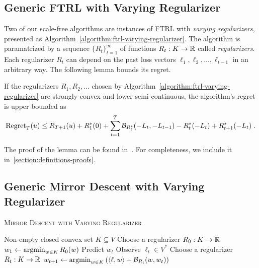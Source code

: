 \subsection{Generic FTRL with Varying Regularizer}
\label{section:generic-ftrl}

Two of our scale-free algorithms are instances of \textsc{FTRL} with
\emph{varying regularizers}, presented as
Algorithm~\ref{algorithm:ftrl-varying-regularizer}.  The algorithm is
paramatrized by a sequence $\{R_t\}_{t=1}^\infty$ of functions $R_t:K \to \mathbb{R}$
called \emph{regularizers}.  Each regularizer $R_t$ can depend on the past loss
vectors $\ell_1, \ell_2, \dots, \ell_{t-1}$ in an arbitrary way.  The following
lemma bounds its regret.

\begin{lemma}
\label{lemma:generic-regret-bound}
If the regularizers $R_1, R_2, \dots$ chosen by
Algorithm~\ref{algorithm:ftrl-varying-regularizer} are strongly convex and lower
semi-continuous, the algorithm's regret is upper bounded as
$$
\operatorname{Regret}_T(u) \le R_{T+1}(u) + R_1^*(0) + \sum_{t=1}^{T} \mathcal{B}_{R_t^*}(-L_t, -L_{t-1}) - R_t^*(-L_t) + R_{t+1}^*(-L_t) \; .
$$
\end{lemma}

The proof of the lemma can be found in~\cite{Orabona-Crammer-Cesa-Bianchi-2014}.
For completeness, we include it in~\ref{section:definitions-proofs}.


\subsection{Generic Mirror Descent with Varying Regularizer}

\begin{algorithm}[t]
\caption{\textsc{Mirror Descent with Varying Regularizer}}
\label{algorithm:mirror-descent-varying-regularizer}
\begin{algorithmic}[1]
\REQUIRE Non-empty closed convex set $K \subseteq V$
\STATE Choose a regularizer $R_0:K \to \mathbb{R}$
\STATE $w_1 \leftarrow \operatorname*{argmin}_{w \in K} R_0(w)$
\STATE Predict $w_t$
\STATE Observe $\ell_t \in V^*$
\STATE Choose a regularizer $R_t:K \to \mathbb{R}$
\STATE $w_{t+1} \leftarrow \operatorname*{argmin}_{w \in K} \left( \langle \ell, w \rangle + \mathcal{B}_{R_t}(w, w_t) \right)$
\ENDFOR
\end{algorithmic}
\end{algorithm}


